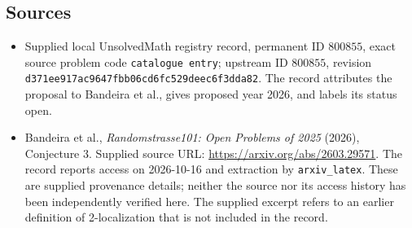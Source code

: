 \documentclass[11pt]{article}
\begin{document}
\subsection{Sources}
\begin{itemize}
\item Supplied local UnsolvedMath registry record, permanent ID \(800855\), exact source problem code \texttt{catalogue entry}; upstream ID \(800855\), revision \texttt{d371ee917ac9647fbb06cd6fc529deec6f3dda82}. The record attributes the proposal to Bandeira et al., gives proposed year 2026, and labels its status open.
\item Bandeira et al., \emph{Randomstrasse101: Open Problems of 2025} (2026), Conjecture 3. Supplied source URL: \url{https://arxiv.org/abs/2603.29571}. The record reports access on 2026-10-16 and extraction by \texttt{arxiv\_latex}. These are supplied provenance details; neither the source nor its access history has been independently verified here. The supplied excerpt refers to an earlier definition of 2-localization that is not included in the record.
\end{itemize}
\end{document}
